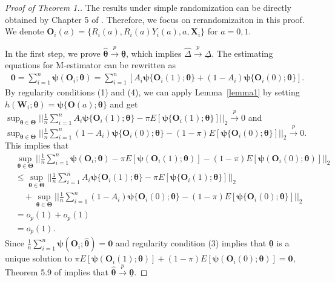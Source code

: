 \documentclass[12pt]{article}
\newcommand{\bX}{\boldsymbol{X}}
\newcommand{\bO}{\boldsymbol{O}}
\newcommand{\bW}{\boldsymbol{W}}
\newcommand{\bzero}{\boldsymbol{0}}
\newcommand{\btheta}{\boldsymbol{\theta}}
\newcommand{\bTheta}{\boldsymbol{\Theta}}
\newcommand{\bpsi}{\boldsymbol{\psi}}
\begin{document}
\begin{proof}[Proof of Theorem 1.]
The results under simple randomization can be directly obtained by Chapter 5 of \cite{vaart_1998}. Therefore, we focus on rerandomizaiton in this proof. We denote $\bO_i(a) = \{R_i(a), R_i(a)Y_i(a), a, \bX_i\}$ for $a  = 0,1$.

In the first step, we prove $\widehat{\btheta} \xrightarrow{p} \underline{\btheta}$, which implies $\widehat{\Delta} \xrightarrow{p} \underline{\Delta}$. The estimating equations for M-estimator can be rewritten as
\begin{align*}
    \bzero = \sum_{i=1}^n \bpsi(\bO_i;\btheta) = \sum_{i=1}^n [A_i\bpsi\{\bO_i(1);\btheta\} + (1-A_i) \bpsi\{\bO_i(0);\btheta\}].
\end{align*}
By regularity conditions (1) and (4), we can apply Lemma~\ref{lemma1} by setting $h(\bW_i; \btheta) = \bpsi\{\bO(a);\btheta\}$ and get $\sup_{\btheta \in \bTheta}||\frac{1}{n} \sum_{i=1}^n A_i \bpsi\{\bO_i(1);\btheta\} - \pi E[\bpsi\{\bO_i(1);\btheta\}] ||_2 \xrightarrow{p} 0$ and $\sup_{\btheta \in \bTheta}||\frac{1}{n} \sum_{i=1}^n (1-A_i) \bpsi\{\bO_i(0);\btheta\} - (1-\pi) E[\bpsi\{\bO_i(0);\btheta\}] ||_2 \xrightarrow{p} 0$. This implies that
\begin{align*}
    &\sup_{\btheta \in \bTheta}||\frac{1}{n} \sum_{i=1}^n\bpsi(\bO_i;\btheta) - \pi E[\bpsi(\bO_i(1);\btheta)] - (1-\pi)E[\bpsi(\bO_i(0);\btheta)]   ||_2 \\
    &\le \sup_{\btheta \in \bTheta}||\frac{1}{n} \sum_{i=1}^n A_i \bpsi\{\bO_i(1);\btheta\} - \pi E[\bpsi\{\bO_i(1);\btheta\}] ||_2\\
    &\quad + \sup_{\btheta \in \bTheta}||\frac{1}{n} \sum_{i=1}^n (1-A_i) \bpsi\{\bO_i(0);\btheta\} - (1-\pi) E[\bpsi\{\bO_i(0);\btheta\}] ||_2\\
    &= o_p(1) + o_p(1) \\
    &= o_p(1).
\end{align*}
Since $\frac{1}{n} \sum_{i=1}^n\bpsi(\bO_i;\widehat{\btheta})=\bzero$ and regularity condition (3) implies that $\underline{\btheta}$ is a unique solution to $\pi E[\bpsi(\bO_i(1);\btheta)] + (1-\pi)E[\bpsi(\bO_i(0);\btheta)] = \bzero$, Theorem 5.9 of \cite{vaart_1998} implies that $\widehat{\btheta} \xrightarrow{p} \underline{\btheta}$.


\end{proof}
\end{document}
